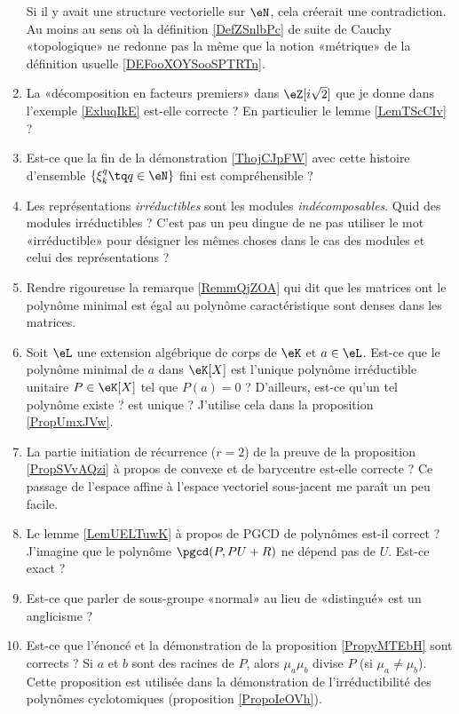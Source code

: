 \begin{enumerate}
        Si il y avait une structure vectorielle sur \( \eN\), cela créerait une contradiction. Au moins au sens où la définition \ref{DefZSnlbPc} de suite de Cauchy «topologique» ne redonne pas la même que la notion «métrique» de la définition usuelle \ref{DEFooXOYSooSPTRTn}.
    \item
        La «décomposition en facteurs premiers» dans \( \eZ[i\sqrt{2}]\) que je donne dans l'exemple \ref{ExluqIkE} est-elle correcte ? En particulier le lemme \ref{LemTScCIv} ?
    \item
        Est-ce que la fin de la démonstration \ref{ThojCJpFW} avec cette histoire d'ensemble \( \{ \xi_k^q\tq q\in \eN \}\) fini est compréhensible ?
    \item
        Les représentations \emph{irréductibles} sont les modules \emph{indécomposables}. Quid des modules irréductibles ? C'est pas un peu dingue de ne pas utiliser le mot «irréductible» pour désigner les mêmes choses dans le cas des modules et celui des représentations ?
    \item
        Rendre rigoureuse la remarque \eqref{RemmQjZOA} qui dit que les matrices ont le polynôme minimal est égal au polynôme caractéristique sont denses dans les matrices.
    \item
        Soit \( \eL\) une extension algébrique de corps de \( \eK\) et \( a\in \eL\). Est-ce que le polynôme minimal de \( a\) dans \( \eK[X]\) est l'unique polynôme irréductible unitaire \( P\in \eK[X]\) tel que \( P(a)=0\) ? D'ailleurs, est-ce qu'un tel polynôme existe ? est unique ? J'utilise cela dans la proposition \ref{PropUmxJVw}.
    \item
        La partie initiation de récurrence (\( r=2\)) de la preuve de la proposition \ref{PropSVvAQzi} à propos de convexe et de barycentre est-elle correcte ? Ce passage de l'espace affine à l'espace vectoriel sous-jacent me paraît un peu facile.
    \item
        Le lemme \ref{LemUELTuwK} à propos de PGCD de polynômes est-il correct ? J'imagine que le polynôme \( \pgcd(P,PU+R)\) ne dépend pas de \( U\). Est-ce exact ?
    \item
        Est-ce que parler de sous-groupe «normal» au lieu de «distingué» est un anglicisme ?
    \item
        Est-ce que l'énoncé et la démonstration de la proposition \ref{PropyMTEbH} sont corrects ? Si \( a\) et \( b\) sont des racines de \( P\), alors \( \mu_a\mu_b\) divise \( P\) (si \( \mu_a\neq \mu_b\)). Cette proposition est utilisée dans la démonstration de l'irréductibilité des polynômes cyclotomiques (proposition \ref{PropoIeOVh}).

\end{enumerate}
